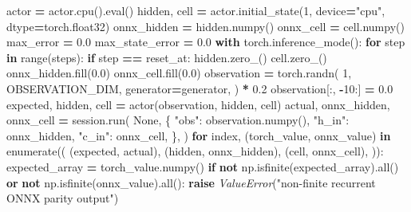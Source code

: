 \documentclass[
  american,
  11pt,
  letterpaper,
]{article}
\newenvironment{Shaded}{\begin{snugshade}}{\end{snugshade}}
\newcommand{\BuiltInTok}[1]{#1}
\newcommand{\ControlFlowTok}[1]{\textcolor[rgb]{0.13,0.29,0.53}{\textbf{#1}}}
\newcommand{\DecValTok}[1]{\textcolor[rgb]{0.00,0.00,0.81}{#1}}
\newcommand{\FloatTok}[1]{\textcolor[rgb]{0.00,0.00,0.81}{#1}}
\newcommand{\KeywordTok}[1]{\textcolor[rgb]{0.13,0.29,0.53}{\textbf{#1}}}
\newcommand{\NormalTok}[1]{#1}
\newcommand{\OperatorTok}[1]{\textcolor[rgb]{0.81,0.36,0.00}{\textbf{#1}}}
\newcommand{\PreprocessorTok}[1]{\textcolor[rgb]{0.56,0.35,0.01}{\textit{#1}}}
\newcommand{\StringTok}[1]{\textcolor[rgb]{0.31,0.60,0.02}{#1}}
\newcommand{\VariableTok}[1]{\textcolor[rgb]{0.00,0.00,0.00}{#1}}
\renewenvironment{Shaded}{\par\smallskip}{\par\smallskip}
\begin{document}
\begin{Shaded}
\begin{Highlighting}[]
\NormalTok{    actor }\OperatorTok{=}\NormalTok{ actor.cpu().}\BuiltInTok{eval}\NormalTok{()}
\NormalTok{    hidden, cell }\OperatorTok{=}\NormalTok{ actor.initial\_state(}\DecValTok{1}\NormalTok{, device}\OperatorTok{=}\StringTok{"cpu"}\NormalTok{, dtype}\OperatorTok{=}\NormalTok{torch.float32)}
\NormalTok{    onnx\_hidden }\OperatorTok{=}\NormalTok{ hidden.numpy()}
\NormalTok{    onnx\_cell }\OperatorTok{=}\NormalTok{ cell.numpy()}
\NormalTok{    max\_error }\OperatorTok{=} \FloatTok{0.0}
\NormalTok{    max\_state\_error }\OperatorTok{=} \FloatTok{0.0}
    \ControlFlowTok{with}\NormalTok{ torch.inference\_mode():}
        \ControlFlowTok{for}\NormalTok{ step }\KeywordTok{in} \BuiltInTok{range}\NormalTok{(steps):}
            \ControlFlowTok{if}\NormalTok{ step }\OperatorTok{==}\NormalTok{ reset\_at:}
\NormalTok{                hidden.zero\_()}
\NormalTok{                cell.zero\_()}
\NormalTok{                onnx\_hidden.fill(}\FloatTok{0.0}\NormalTok{)}
\NormalTok{                onnx\_cell.fill(}\FloatTok{0.0}\NormalTok{)}
\NormalTok{            observation }\OperatorTok{=}\NormalTok{ torch.randn(}
                \DecValTok{1}\NormalTok{,}
\NormalTok{                OBSERVATION\_DIM,}
\NormalTok{                generator}\OperatorTok{=}\NormalTok{generator,}
\NormalTok{            ) }\OperatorTok{*} \FloatTok{0.2}
\NormalTok{            observation[:, }\OperatorTok{{-}}\DecValTok{10}\NormalTok{:] }\OperatorTok{=} \FloatTok{0.0}
\NormalTok{            expected, hidden, cell }\OperatorTok{=}\NormalTok{ actor(observation, hidden, cell)}
\NormalTok{            actual, onnx\_hidden, onnx\_cell }\OperatorTok{=}\NormalTok{ session.run(}
                \VariableTok{None}\NormalTok{,}
\NormalTok{                \{}
                    \StringTok{"obs"}\NormalTok{: observation.numpy(),}
                    \StringTok{"h\_in"}\NormalTok{: onnx\_hidden,}
                    \StringTok{"c\_in"}\NormalTok{: onnx\_cell,}
\NormalTok{                \},}
\NormalTok{            )}
            \ControlFlowTok{for}\NormalTok{ index, (torch\_value, onnx\_value) }\KeywordTok{in} \BuiltInTok{enumerate}\NormalTok{((}
\NormalTok{                (expected, actual), (hidden, onnx\_hidden), (cell, onnx\_cell),}
\NormalTok{            )):}
\NormalTok{                expected\_array }\OperatorTok{=}\NormalTok{ torch\_value.numpy()}
                \ControlFlowTok{if} \KeywordTok{not}\NormalTok{ np.isfinite(expected\_array).}\BuiltInTok{all}\NormalTok{() }\KeywordTok{or} \KeywordTok{not}\NormalTok{ np.isfinite(onnx\_value).}\BuiltInTok{all}\NormalTok{():}
                    \ControlFlowTok{raise} \PreprocessorTok{ValueError}\NormalTok{(}\StringTok{"non{-}finite recurrent ONNX parity output"}\NormalTok{)}

\end{Highlighting}
\end{Shaded}
\end{document}
